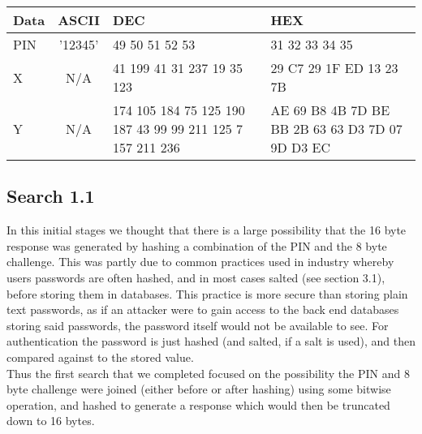 \documentclass[bsc,frontabs,twoside,singlespacing,parskip,deptreport]{infthesis}     %
\begin{document}
\begin{center}
\begin{tabular}{|l|c|p{5cm}|p{5cm}|}
\hline
Data & ASCII & DEC & HEX\\
\hline
PIN & '12345' & 49 50 51 52 53 & 31 32 33 34 35\\
\hline
X & N/A & 41 199 41 31 237 19 35 123 & 29 C7 29 1F ED 13 23 7B\\
\hline
Y & N/A & 174 105 184 75 125 190 187 43 99 99 211 125 7 157 211 236 & AE 69 B8 4B 7D BE BB 2B 63 63 D3 7D 07 9D D3 EC\\
\hline
\end{tabular}
\end{center}


\subsection{Search 1.1}
\noindent In this initial stages we thought that there is a large possibility that the 16 byte response was generated by hashing a combination of the PIN and the 8 byte challenge. This was partly due to common practices used in industry whereby users passwords are often hashed, and in most cases salted (see section 3.1), before storing them in databases. This practice is more secure than storing plain text passwords, as if an attacker were to gain access to the back end databases storing said passwords, the password itself would not be available to see. For authentication the password is just hashed (and salted, if a salt is used), and then compared against to the stored value.\\

\noindent Thus the first search that we completed focused on the possibility the PIN and 8 byte challenge were joined (either before or after hashing) using some bitwise operation, and hashed to generate a response which would then be truncated down to 16 bytes.
\end{document}
